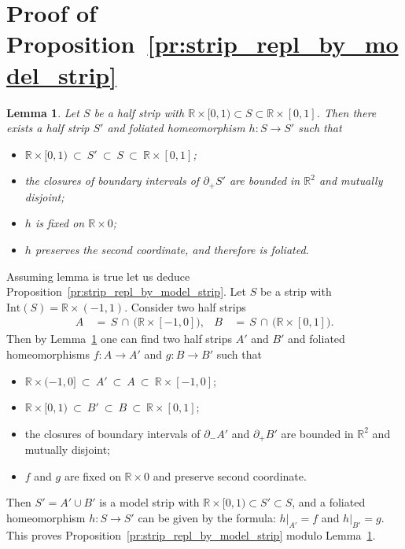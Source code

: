 \documentclass[12pt, reqno]{amsart}
\newcommand{\lemmaname}{Lemma}%
\newtheorem{lemma}[subsection]{\protect\lemmaname}
\newcommand{\bR}{\mathbb{R}}
\newcommand{\Int}{\mathrm{Int}}
\newcommand\dif{h}
\newcommand{\strip}{S}
\begin{document}
\section{Proof of Proposition~\ref{pr:strip_repl_by_model_strip}}\label{sect:proof:pr:strip_repl_by_model_strip}
\begin{lemma}\label{lm:half_strip_repl_by_model_half_strip}
Let $\strip$ be a half strip with $\bR\times[0,1) \subset \strip \subset \bR\times[0,1]$.
Then there exists a half strip $\strip'$ and foliated homeomorphism $\dif:\strip\to\strip'$ such that 
\begin{itemize}[leftmargin=2em]
\item 
$\bR\times[0,1) \ \subset \ \strip' \ \subset \ \strip \  \subset \ \bR\times[0,1]$;
\item 
the closures of boundary intervals of $\partial_{+}\strip'$ are bounded in $\bR^2$ and mutually disjoint;
\item 
$\dif$ is fixed on $\bR\times 0$;
\item 
$\dif$ preserves the second coordinate, and therefore is foliated.
\end{itemize}
\end{lemma}

Assuming lemma is true let us deduce Proposition~\ref{pr:strip_repl_by_model_strip}.
Let $\strip$ be a strip with $\Int(\strip)=\bR\times(-1,1)$.
Consider two half strips 
\begin{align*}
A\, &= \, \strip \, \cap \, \bigl(\bR\times[-1,0]\bigr), &
B\, &= \, \strip \, \cap \, \bigl(\bR\times[0,1]\bigr).
\end{align*}
Then by Lemma~\ref{lm:half_strip_repl_by_model_half_strip} one can find two half strips $A'$ and $B'$ and foliated homeomorphisms $f:A \to A'$ and $g:B \to B'$ such that 
\begin{itemize}[leftmargin=2em]
\item 
$\bR\times(-1,0] \ \subset \ A'  \ \subset \ A \  \subset \ \bR\times[-1,0]$;
\item 
$\bR\times[0,1) \ \subset \ B'  \ \subset \ B \  \subset \ \bR\times[0,1]$;
\item 
the closures of boundary intervals of $\partial_{-} A'$ and $\partial_{+} B'$ are bounded in $\bR^2$ and mutually disjoint;
\item 
$f$ and $g$ are fixed on $\bR\times 0$ and preserve second coordinate.
\end{itemize}
Then $\strip' = A' \cup B'$ is a model strip with $\bR\times[0,1)  \subset  \strip'  \subset  \strip$,
and a foliated homeomorphism $\dif:\strip\to\strip'$ can be given by the formula: $\dif|_{A'} = f$ and $\dif|_{B'} = g$.
This proves Proposition~\ref{pr:strip_repl_by_model_strip} modulo Lemma~\ref{lm:half_strip_repl_by_model_half_strip}. 
\end{document}
